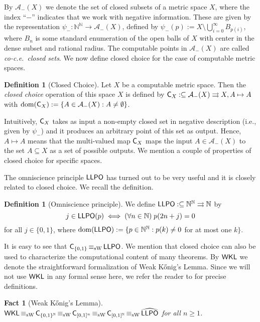 \documentclass[a4paper]{amsart}
\def\AA{{\mathcal A}}
\def\IN{{\mathbb{N}}}
\def\In{\subseteq}
\def\mto{\rightrightarrows}
\def\dom{{\rm dom}}
\def\Cantor{{\{0,1\}^\IN}}
\def\LLPO{\text{\rm\sffamily LLPO}}
\def\WKL{\text{\rm\sffamily WKL}}
\def\C{\mbox{\rm\sffamily C}}
\def\LLPO{\mbox{\rm\sffamily LLPO}}
\def\equivSW{\mathop{\equiv_{\mathrm{sW}}}}
\newtheorem{fact}[theorem]{Fact}
\theoremstyle{definition}
\newtheorem{definition}[theorem]{Definition}
\begin{document}
By $\AA_-(X)$ we denote the set of closed subsets of a metric space $X$, where the index ``$-$'' indicates
that we work with negative information. These are given by the representation $\psi_-:\IN^\IN\to\AA_-(X)$, defined by
$\psi_-(p):=X\setminus\bigcup_{i=0}^\infty B_{p(i)}$,
where $B_n$ is some standard enumeration of the open balls of $X$ with center in the dense subset and rational radius.
The computable points in $\AA_-(X)$ are called {\em co-c.e.\ closed sets}.
We now define closed choice for the case of computable metric spaces.

\begin{definition}[Closed Choice]
Let $X$ be a computable metric space. Then the {\em closed choice} operation 
of this space $X$ is defined by
$\C_X:\In\AA_-(X)\mto X,A\mapsto A$
with $\dom(\C_X):=\{A\in\AA_-(X):A\not=\emptyset\}$.
\end{definition}

Intuitively, $\C_X$ takes as input a non-empty closed set in negative description (i.e., given by $\psi_-$) 
and it produces an arbitrary point of this set as output.
Hence, $A\mapsto A$ means that the multi-valued map $\C_X$ maps
the input $A\in\AA_-(X)$ to the set $A\In X$ as a set of possible outputs.
We mention a couple of properties of closed choice for specific spaces.

The omniscience principle $\LLPO$ has turned out to be very useful and it is closely related to
closed choice. We recall the definition.

\begin{definition}[Omniscience principle]
We define $\LLPO:\In\IN^\IN\mto\IN$ by
\[j\in\LLPO(p)\iff(\forall n\in\IN)\;p(2n+j)=0\]
for all $j\in\{0,1\}$, where
$\dom(\LLPO):=\{p\in\IN^\IN:p(k)\not=0$ for at most one $k\}$.
\end{definition}

It is easy to see that $\C_{\{0,1\}}\equivSW\LLPO$.
We mention that closed choice can also be used to characterize the computational content of many
theorems. By $\WKL$ we denote the straightforward formalization of Weak K\H{o}nig's Lemma. 
Since we will not use $\WKL$ in any formal sense here, we refer the reader to \cite{GM09,BG11} for precise definitions.

\begin{fact}[Weak K\H{o}nig's Lemma]
\label{fact:WKL}
$\WKL\equivSW\C_{\Cantor}\equivSW\C_{[0,1]^n}\equivSW\C_{[0,1]^\IN}\equivSW\widehat{\LLPO}$ for all $n\geq1$.
\end{fact}
\end{document}
